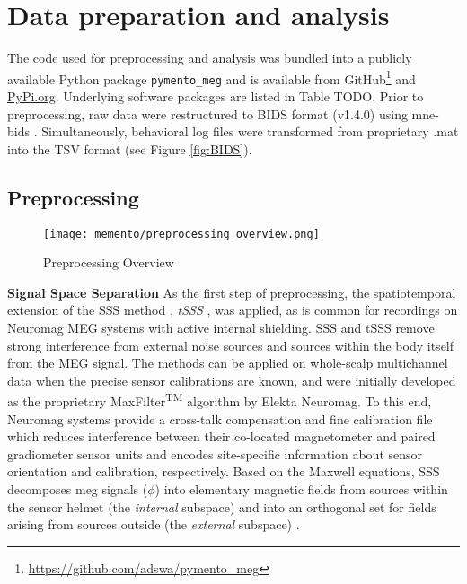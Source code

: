 \section{Data preparation and analysis}

The code used for preprocessing and analysis was bundled into a publicly available Python package \texttt{pymento\_meg} and is available from GitHub\footnote{\url{https://github.com/adswa/pymento_meg}} and \url{PyPi.org}.
Underlying software packages are listed in Table TODO.
Prior to preprocessing, raw data were restructured to \gls{BIDS} format (v1.4.0) using mne-bids \citep{Appelhoff2019}.
Simultaneously, behavioral log files were transformed from proprietary .mat into the TSV format (see Figure \ref{fig:BIDS}).

\subsection{Preprocessing}

\begin{figure}
	\centering
	\texttt{[image: memento/preprocessing\_overview.png]}
	\caption[Preprocessing overview]{Preprocessing Overview}
	\label{fig:preproc}
\end{figure}

\textbf{Signal Space Separation} As the first step of preprocessing, the spatiotemporal extension of the \gls{SSS} method \citep{taulu2005presentation}, \textit{\gls{tSSS}} \citep{taulu2006spatiotemporal}, was applied, as is common for recordings on Neuromag MEG systems with active internal shielding.
\gls{SSS} and \gls{tSSS} remove strong interference from external noise sources and sources within the body itself from the MEG signal.
The methods can be applied on whole-scalp multichannel data when the precise sensor calibrations are known, and were initially developed as the proprietary MaxFilter\textsuperscript{TM} algorithm by Elekta Neuromag.
To this end, Neuromag systems provide a cross-talk compensation and fine calibration file which reduces interference between their co-located magnetometer and paired gradiometer sensor units and encodes site-specific information about sensor orientation and calibration, respectively.
Based on the Maxwell equations, \gls{SSS} decomposes \gls{meg} signals ($\phi$) into elementary magnetic fields from sources within the sensor helmet (the \textit{internal} subspace) and into an orthogonal set for fields arising from sources outside (the \textit{external} subspace)  \citep{taulu2006spatiotemporal}. 

